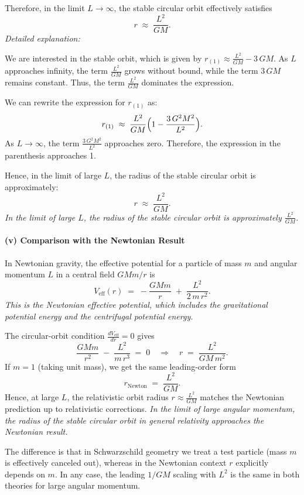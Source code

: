 \documentclass{article}
\begin{document}
Therefore, in the limit $L \rightarrow \infty$, the stable circular orbit effectively satisfies
\[
r \;\approx\; \frac{L^2}{GM}.
\]
\textit{Detailed explanation:}

We are interested in the stable orbit, which is given by $r_{(1)} \approx \frac{L^2}{GM} - 3\,GM$. As $L$ approaches infinity, the term $\frac{L^2}{GM}$ grows without bound, while the term $3\,GM$ remains constant. Thus, the term $\frac{L^2}{GM}$ dominates the expression.

We can rewrite the expression for $r_{(1)}$ as:
\[
r_{(1)} \;\approx\; \frac{L^2}{GM}\Bigl(1 - \frac{3\,G^2M^2}{L^2}\Bigr).
\]
As $L \rightarrow \infty$, the term $\frac{3\,G^2M^2}{L^2}$ approaches zero. Therefore, the expression in the parenthesis approaches 1.

Hence, in the limit of large $L$, the radius of the stable circular orbit is approximately:
\[
r \;\approx\; \frac{L^2}{GM}.
\]
\textit{In the limit of large $L$, the radius of the stable circular orbit is approximately $\frac{L^2}{GM}$.}

\paragraph{(v) Comparison with the Newtonian Result}

In Newtonian gravity, the effective potential for a particle of mass $m$ and angular momentum $L$ in a central field $GMm/r$ is
\[
V_{\text{eff}}(r)
\;=\;
-\frac{GMm}{r} \;+\;\frac{L^2}{2\,m\,r^2}.
\]
\textit{This is the Newtonian effective potential, which includes the gravitational potential energy and the centrifugal potential energy.}

The circular-orbit condition $\tfrac{dV_{\text{eff}}}{dr} = 0$ gives
\[
\frac{GMm}{r^2} \;-\;\frac{L^2}{m\,r^3} \;=\; 0
\quad\Longrightarrow\quad
r \;=\; \frac{L^2}{GM\,m^2}.
\]
If $m=1$ (taking unit mass), we get the same leading-order form
\[
r_{\text{Newton}}
\;=\;
\frac{L^2}{GM}.
\]
Hence, at large $L$, the relativistic orbit radius $r \approx \tfrac{L^2}{GM}$ matches the Newtonian prediction up to relativistic corrections.
\textit{In the limit of large angular momentum, the radius of the stable circular orbit in general relativity approaches the Newtonian result.}

The difference is that in Schwarzschild geometry we treat a test particle (mass $m$ is effectively canceled out), whereas in the Newtonian context $r$ explicitly depends on $m$. In any case, the leading $1/GM$ scaling with $L^2$ is the same in both theories for large angular momentum.
\end{document}
